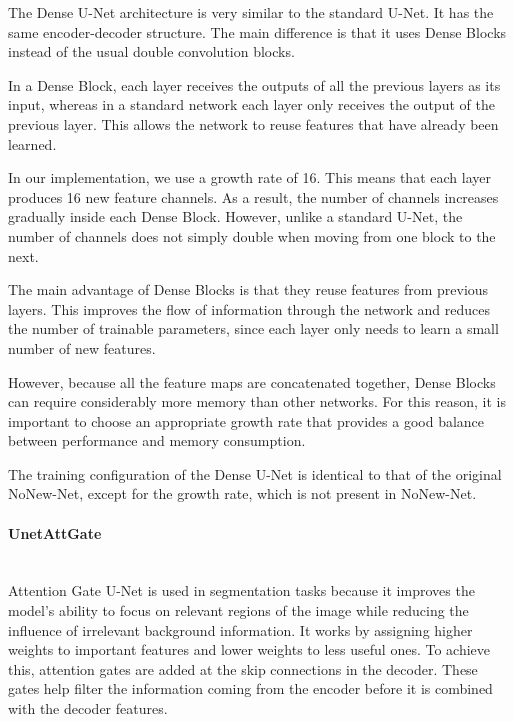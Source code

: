 \documentclass[12pt]{article}
\begin{document}
The Dense U-Net architecture is very similar to the standard U-Net.
It has the same encoder-decoder structure.
The main difference is that it uses Dense Blocks instead of the usual double convolution blocks.
\vspace{0.5cm}

In a Dense Block, each layer receives the outputs of all the previous layers as its input, whereas in a standard network each layer only receives the output of the previous layer.
This allows the network to reuse features that have already been learned.
\vspace{0.5cm}

In our implementation, we use a growth rate of 16. This means that each layer produces 16 new feature channels.
As a result, the number of channels increases gradually inside each Dense Block. 
However, unlike a standard U-Net, the number of channels does not simply double when moving from one block to the next.
\vspace{0.5cm}

The main advantage of Dense Blocks is that they reuse features from previous layers.
This improves the flow of information through the network and reduces the number of trainable parameters, since each layer only needs to learn a small number of new features.
\vspace{0.5cm}

However, because all the feature maps are concatenated together, Dense Blocks can require considerably more memory than other networks.
For this reason, it is important to choose an appropriate growth rate that provides a good balance between performance and memory consumption.
\vspace{0.5cm}

The training configuration of the Dense U-Net is identical to that of the original NoNew-Net, except for the growth rate, which is not present in NoNew-Net.


\paragraph{UnetAttGate}
\mbox{}\\

Attention Gate U-Net \cite{AttentionUnet} is used in segmentation tasks because it improves the model's ability to focus on relevant regions of the image while reducing the influence of irrelevant background information.
It works by assigning higher weights to important features and lower weights to less useful ones.
To achieve this, attention gates are added at the skip connections in the decoder.
These gates help filter the information coming from the encoder before it is combined with the decoder features.
\vspace{0.5cm}
\end{document}
